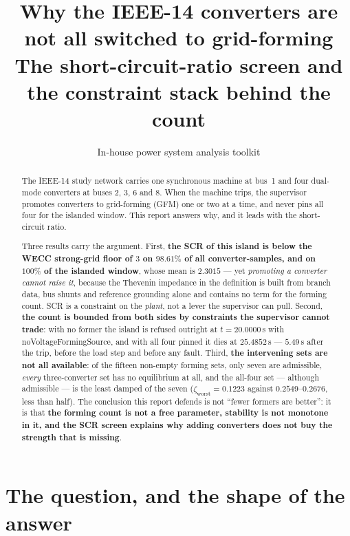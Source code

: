 \documentclass[12pt,a4paper]{article}
\title{\bfseries Why the IEEE-14 converters are not all switched to grid-forming\\[4pt]
\large The short-circuit-ratio screen and the constraint stack behind the count}
\author{In-house power system analysis toolkit}
\date{}
\theoremstyle{remark}
\newcommand{\zworst}{\zeta_{\mathrm{worst}}}
\newcommand{\code}[1]{{\ttfamily\small\hyphenchar\font=-1 #1}}
\begin{document}
\maketitle
\thispagestyle{fancy}

\begin{abstract}
\noindent
The IEEE-14 study network carries one synchronous machine at bus~1 and four
dual-mode converters at buses 2, 3, 6 and 8. When the machine trips, the
supervisor promotes converters to grid-forming (GFM) one or two at a time, and
never pins all four for the islanded window. This report answers why, and it
leads with the short-circuit ratio.

Three results carry the argument. First, \textbf{the SCR of this island is below
the WECC strong-grid floor of $3$ on $98.61\%$ of all converter-samples, and on
$100\%$ of the islanded window}, whose mean is $2.3015$ --- yet \emph{promoting a
converter cannot raise it}, because the Thevenin impedance in the definition is
built from branch data, bus shunts and reference grounding alone and contains no
term for the forming count. SCR is a constraint on the \emph{plant}, not a lever
the supervisor can pull. Second, \textbf{the count is bounded from both sides by
constraints the supervisor cannot trade}: with no former the island is refused
outright at $t=20.0000$\,s with \code{noVoltageFormingSource}, and with all four
pinned it dies at $25.4852$\,s --- $5.49$\,s after the trip, before the load
step and before any fault. Third, \textbf{the intervening sets are not all
available}: of the fifteen non-empty forming sets, only seven are admissible,
\emph{every} three-converter set has no equilibrium at all, and the all-four set
--- although admissible --- is the least damped of the seven
($\zworst = 0.1223$ against $0.2549$--$0.2676$, less than half). The conclusion
this report defends is not ``fewer formers are better'': it is that
\textbf{the forming count is not a free parameter, stability is not monotone in
it, and the SCR screen explains why adding converters does not buy the strength
that is missing}.
\end{abstract}

\tableofcontents
\clearpage

\section{The question, and the shape of the answer}
\end{document}

